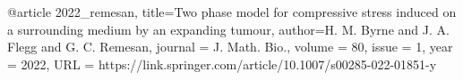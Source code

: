 @article{
      2022_remesan,
	title={Two phase model for compressive stress induced on a surrounding medium by an expanding tumour},
	author={H. M. Byrne and J. A. Flegg and G. C. Remesan},
      journal = {J. Math. Bio.},
      volume = {80},
      issue = {1},
      year = 2022, 
      URL = {https://link.springer.com/article/10.1007/s00285-022-01851-y}
}
